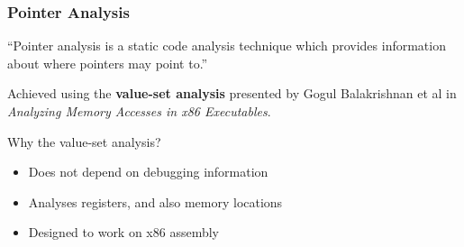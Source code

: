 \documentclass[10pt, xcolor={dvipsnames}]{beamer}
\begin{document}
\begin{frame}
	\frametitle{Pointer Analysis}
	\begin{exampleblock}{}
		{\large “\alert{Pointer analysis} is a static code analysis technique which provides information about where pointers may point to.”}
	\end{exampleblock}
	
	\begin{block}{}
		Achieved using the \textbf{value-set analysis} presented by Gogul Balakrishnan et al in \textit{Analyzing Memory Accesses in x86 Executables}.
	\end{block}
	
	\begin{block}{Why the value-set analysis?}
		\begin{itemize}
			\item Does not depend on debugging information
			\item Analyses registers, and also memory locations
			\item Designed to work on x86 assembly
		\end{itemize}
	\end{block}
\end{frame}

%	
\end{document}
